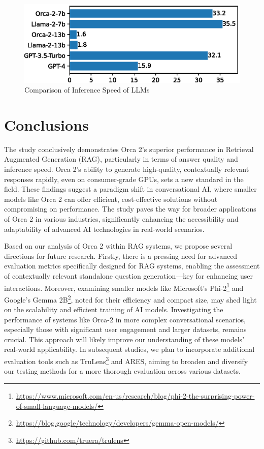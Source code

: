 \documentclass[runningheads]{llncs}
\begin{document}
\begin{figure}
    \centering
    \includegraphics[width=0.6\linewidth]{figures/inference_speed.eps}
    \caption{Comparison of Inference Speed of LLMs}
    \label{fig:speed}
\end{figure}

\section{Conclusions}
\label{sec:Conclusions}
The study conclusively demonstrates Orca 2's superior performance in Retrieval Augmented Generation (RAG), particularly in terms of answer quality and inference speed. Orca 2's ability to generate high-quality, contextually relevant responses rapidly, even on consumer-grade GPUs, sets a new standard in the field. These findings suggest a paradigm shift in conversational AI, where smaller models like Orca 2 can offer efficient, cost-effective solutions without compromising on performance. The study paves the way for broader applications of Orca 2 in various industries, significantly enhancing the accessibility and adaptability of advanced AI technologies in real-world scenarios.

Based on our analysis of Orca 2 within RAG systems, we propose several directions for future research. Firstly, there is a pressing need for advanced evaluation metrics specifically designed for RAG systems, enabling the assessment of contextually relevant standalone question generation—key for enhancing user interactions. Moreover, examining smaller models like Microsoft's Phi-2\footnote{\url{https://www.microsoft.com/en-us/research/blog/phi-2-the-surprising-power-of-small-language-models/}} and Google's Gemma 2B\footnote{\url{https://blog.google/technology/developers/gemma-open-models/}}, noted for their efficiency and compact size, may shed light on the scalability and efficient training of AI models. Investigating the performance of systems like Orca-2 in more complex conversational scenarios, especially those with significant user engagement and larger datasets, remains crucial. This approach will likely improve our understanding of these models' real-world applicability. In subsequent studies, we plan to incorporate additional evaluation tools such as TruLens\footnote{\url{https://github.com/truera/trulens}} and ARES\cite{saad2023ares}, aiming to broaden and diversify our testing methods for a more thorough evaluation across various datasets.
\end{document}
